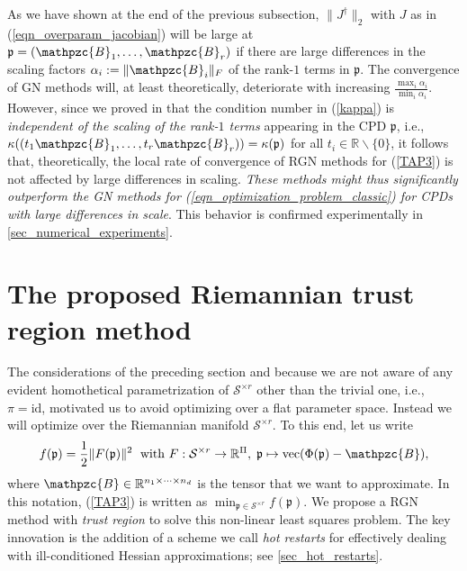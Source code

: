 \documentclass[a4paper,10pt,final]{siamart1116}
\newcommand{\tuple}[1]{\mathfrak{#1}}
\newcommand{\Var}[1]{\mathcal{#1}}
\newcommand{\tensor}[1]{\mathpzc{#1}}
\newcommand{\R}{\mathbb{R}}
\newcommand{\refeqn}[1]{{(\ref{#1})}}
\newcommand{\refsec}[1]{{\cref{#1}}}
\numberwithin{equation}{section}
\numberwithin{figure}{section}
\numberwithin{table}{section}
\numberwithin{theorem}{section}
\begin{document}
As we have shown at the end of the previous subsection, $\|J^\dagger\|_2$ with $J$ as in \refeqn{eqn_overparam_jacobian} will be large at $\tuple{p} = (\tensor{B}_1,\ldots,\tensor{B}_r)$ if there are large differences in the scaling factors $\alpha_i := \|\tensor{B}_i\|_F$ of the rank-$1$ terms in $\tuple{p}$. The convergence of GN methods will, at least theoretically, deteriorate with increasing $\frac{\max_i \alpha_i}{\min_i \alpha_i}$. However, since we proved in \cite[Proposition 5.1]{BV2017} that the condition number in \refeqn{kappa} is \emph{independent of the scaling of the rank-$1$ terms} appearing in the CPD $\tuple{p}$, i.e., $\kappa((t_1 \tensor{B}_1, \ldots, t_r \tensor{B}_r)) = \kappa(\tuple{p})$ for all $t_i\in\R\backslash\{0\}$, it follows that, theoretically, the local rate of convergence of RGN methods for \refeqn{TAP3} is not affected by large differences in scaling. \emph{These methods might thus significantly outperform the GN methods for \refeqn{eqn_optimization_problem_classic} for CPDs with large differences in scale}. This behavior is confirmed experimentally in \refsec{sec_numerical_experiments}.

\section{The proposed Riemannian trust region method}\label{sec_RGN}
The considerations of the preceding section and because we are not aware of any evident homothetical parametrization of $\Var{S}^{\times r}$ other than the trivial one, i.e., $\pi=\mathrm{id}$, motivated us to avoid optimizing over a flat parameter space. Instead we will optimize over the Riemannian manifold $\Var{S}^{\times r}$. To this end, let us write
$$
 f(\tuple{p}) = \frac{1}{2} \|F(\tuple{p})\|^2  \;\text{ with }
 F : \Var{S}^{\times r} \to \R^\Pi,\; \tuple{p} \mapsto \operatorname{vec}( \Phi(\tuple{p}) - \tensor{B} ),
$$
where $\tensor{B} \in \R^{n_1 \times \cdots \times n_d}$ is the tensor that we want to approximate. In this notation, \refeqn{TAP3} is written as $ \min_{ \tuple{p}\in\Var{S}^{\times r}} f(\tuple{p})$. We propose a RGN method with \emph{trust region} \cite[section 7]{AMS2008} to solve this non-linear least squares problem. The key innovation is the addition of a scheme we call \emph{hot restarts} for effectively dealing with ill-conditioned Hessian approximations; see \refsec{sec_hot_restarts}.
\end{document}

